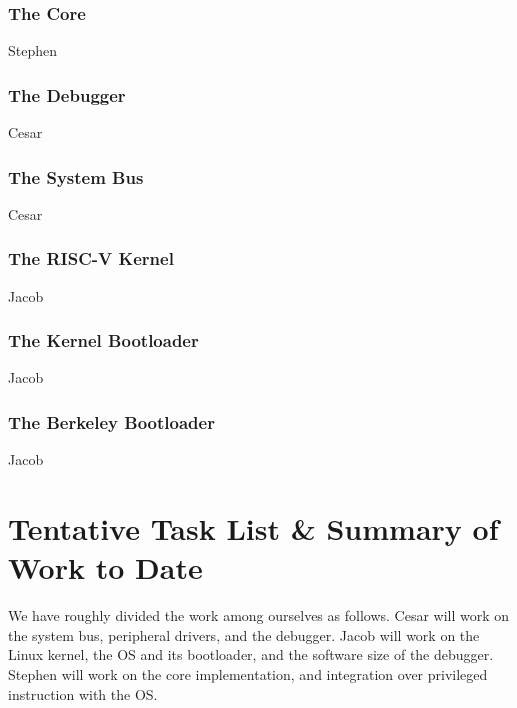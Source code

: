 \documentclass{article}
\begin{document}
    \subsubsection{The Core}
    Stephen
    
    \subsubsection{The Debugger}
    Cesar
    
    \subsubsection{The System Bus}
    Cesar
    
    \subsubsection{The RISC-V Kernel}
    Jacob
    
    \subsubsection{The Kernel Bootloader}
    Jacob
    
    \subsubsection{The Berkeley Bootloader}
    Jacob


\section{Tentative Task List \& Summary of Work to Date}
We have roughly divided the work among ourselves as follows.  Cesar will work on the system bus, peripheral drivers, and the debugger.  Jacob will work on the Linux kernel, the OS and its bootloader, and the software size of the debugger.  Stephen will work on the core implementation, and integration over privileged instruction with the OS.
\end{document}
